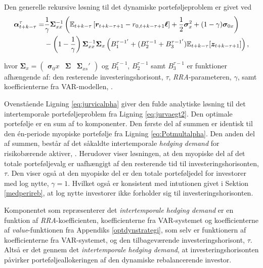 \documentclass[
  a4paper,
  oneside]{memoir}
\begin{document}
Den generelle rekursive løsning til det dynamiske porteføljeproblem er givet ved
\begin{align}
\bm{\alpha}_{t+k-\tau}^\tau = &\frac{1}{\gamma} \bm{\Sigma}_{xx}^{-1} \left( \mathbb{E}_{t+k-\tau} \left[ \bm{r}_{t+k-\tau+1} - r_{0,t+k-\tau+1} \bm{\ell} \right] + \frac{1}{2} \bm{\sigma}_x^2 + (1-\gamma) \bm{\sigma}_{0x} \right) \notag\\
&- \left(1-\frac{1}{\gamma} \right) \bm{\Sigma}_{xx}^{-1} \bm{\Sigma}_x \left(B_1^{\tau-1'}+(B_2^{\tau-1}+B_3^{\tau-1'})\mathbb{E}_{t+k-\tau}[\bm{z}_{t+k-\tau+1}]\right),\label{eq:jurvicalpha}
\end{align}

hvor \(\bm{\Sigma}_x=\begin{pmatrix}\bm{\sigma}_0x & \bm{\Sigma} & \bm{\Sigma}_{xs}'\end{pmatrix}\) og \(B_1^{\tau-1}\), \(B_2^{\tau-1}\) samt \(B_3^{\tau-1}\) er funktioner afhængende af: den resterende investeringshorisont, \(\tau\), \emph{RRA}-parameteren, \(\gamma\), samt koefficienterne fra VAR-modellen, \citep{JurVic2011}.

Ovenstående Ligning \eqref{eq:jurvicalpha} giver den fulde analytiske løsning til det intertemporale porteføljeproblem fra Ligning \eqref{eq:jurvaegt2}. Den optimale portefølje er en sum af to komponenter. Den første del af summen er identisk til den én-periode myopiske portefølje fra Ligning \eqref{eq:Potmultalpha}. Den anden del af summen, består af det såkaldte intertemporale \emph{hedging demand} for risikobærende aktiver, \citep{Merton1969, Merton1971, Merton1973}. Herudover viser løsningen, at den myopiske del af det totale porteføljevalg er uafhængigt af den resterende tid til investeringshorisonten, \(\tau\). Den viser også at den myopiske del er den totale porteføljedel for investorer med log nytte, \(\gamma=1\). Hvilket også er konsistent med intutionen givet i Sektion \ref{medperireb}, at log nytte investorer ikke forholder sig til investeringshorisonten.

Komponentet som repræsenterer det \emph{intertemporale hedging demand} er en funktion af \emph{RRA}-koefficienten, koefficienterne fra VAR-systemet og koefficienterne af \emph{value}-funktionen fra Appendiks \ref{optdynstrategi}, som selv er funktionern af koefficienterne fra VAR-systemet, og den tilbageværende investeringshorisont, \(\tau\). Altså er det gennem det \emph{intertemporale hedging demand}, at investeringshorisonten påvirker porteføljeallokeringen af den dynamiske rebalancerende investor.
\end{document}

